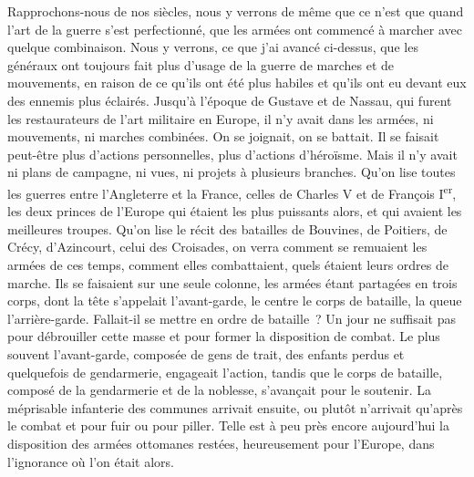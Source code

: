 \documentclass[french,twoside]{book} %
\begin{document}
Rapprochons-nous de nos siècles, nous y verrons de même que ce n’est que quand l’art de la guerre s’est perfectionné, que les armées ont commencé à marcher avec quelque combinaison. Nous y verrons, ce que j’ai avancé ci-dessus, que les généraux ont toujours fait plus d’usage de la guerre de marches et de mouvements, en raison de ce qu’ils ont été plus habiles et qu’ils ont eu devant eux des ennemis plus éclairés. Jusqu’à l’époque de Gustave et de Nassau, qui furent les restaurateurs de l’art militaire en Europe, il n’y avait dans les armées, ni mouvements, ni marches combinées. On se joignait, on se battait. Il se faisait peut-être plus d’actions personnelles, plus d’actions d’héroïsme. Mais il n’y avait ni plans de campagne, ni vues, ni projets à plusieurs branches. Qu’on lise toutes les guerres entre l’Angleterre et la France, celles de Charles V et de François I\textsuperscript{er}, les deux princes de l’Europe qui étaient les plus puissants alors, et qui avaient les meilleures troupes. Qu’on lise le récit des batailles de Bouvines, de Poitiers, de Crécy, d’Azincourt, celui des Croisades, on verra comment se remuaient les armées de ces temps, comment elles combattaient, quels étaient leurs ordres de marche. Ils se faisaient sur une seule colonne, les armées étant partagées en trois corps, dont la tête s’appelait l’avant-garde, le centre le corps de bataille, la queue l’arrière-garde. Fallait-il se mettre en ordre de bataille ? Un jour ne suffisait pas pour débrouiller cette masse et pour former la disposition de combat. Le plus souvent l’avant-garde, composée de gens de trait, des enfants perdus et quelquefois de gendarmerie, engageait l’action, tandis que le corps de bataille, composé de la gendarmerie et de la noblesse, s’avançait pour le soutenir. La méprisable infanterie des communes arrivait ensuite, ou plutôt n’arrivait qu’après le combat et pour fuir ou pour piller. Telle est à peu près encore aujourd’hui la disposition des armées ottomanes restées, heureusement pour l’Europe, dans l’ignorance où l’on était alors.\par
\end{document}
